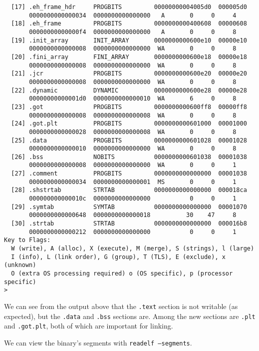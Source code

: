 \begin{lstlisting}
  [17] .eh_frame_hdr     PROGBITS         00000000004005d0  000005d0
       0000000000000034  0000000000000000   A       0     0     4
  [18] .eh_frame         PROGBITS         0000000000400608  00000608
       00000000000000f4  0000000000000000   A       0     0     8
  [19] .init_array       INIT_ARRAY       0000000000600e10  00000e10
       0000000000000008  0000000000000000  WA       0     0     8
  [20] .fini_array       FINI_ARRAY       0000000000600e18  00000e18
       0000000000000008  0000000000000000  WA       0     0     8
  [21] .jcr              PROGBITS         0000000000600e20  00000e20
       0000000000000008  0000000000000000  WA       0     0     8
  [22] .dynamic          DYNAMIC          0000000000600e28  00000e28
       00000000000001d0  0000000000000010  WA       6     0     8
  [23] .got              PROGBITS         0000000000600ff8  00000ff8
       0000000000000008  0000000000000008  WA       0     0     8
  [24] .got.plt          PROGBITS         0000000000601000  00001000
       0000000000000028  0000000000000008  WA       0     0     8
  [25] .data             PROGBITS         0000000000601028  00001028
       0000000000000010  0000000000000000  WA       0     0     8
  [26] .bss              NOBITS           0000000000601038  00001038
       0000000000000008  0000000000000000  WA       0     0     1
  [27] .comment          PROGBITS         0000000000000000  00001038
       0000000000000034  0000000000000001  MS       0     0     1
  [28] .shstrtab         STRTAB           0000000000000000  000018ca
       000000000000010c  0000000000000000           0     0     1
  [29] .symtab           SYMTAB           0000000000000000  00001070
       0000000000000648  0000000000000018          30    47     8
  [30] .strtab           STRTAB           0000000000000000  000016b8
       0000000000000212  0000000000000000           0     0     1
Key to Flags:
  W (write), A (alloc), X (execute), M (merge), S (strings), l (large)
  I (info), L (link order), G (group), T (TLS), E (exclude), x (unknown)
  O (extra OS processing required) o (OS specific), p (processor specific)
> 
\end{lstlisting}

We can see from the output above that the \texttt{.text} section is not writable
(as expected), but the \texttt{.data} and \texttt{.bss} sections are. Among the
new sections are \texttt{.plt} and \texttt{.got.plt}, both of which are
important for linking.

We can view the binary's segments with \texttt{readelf --segments}.

